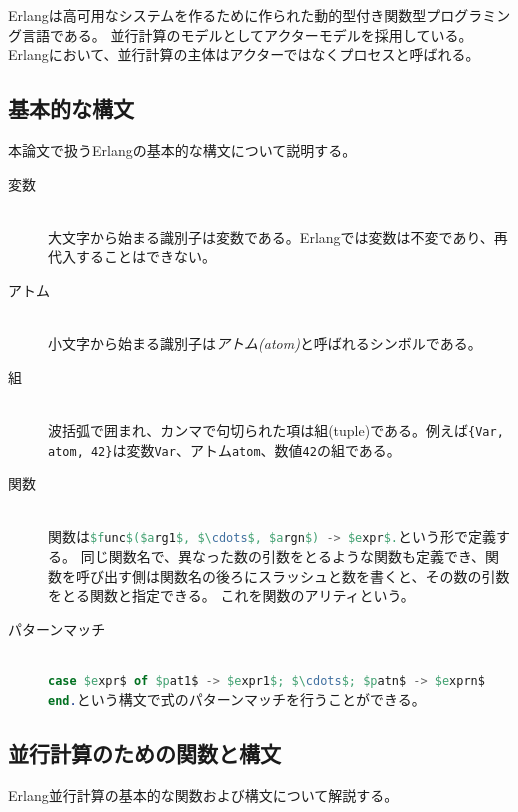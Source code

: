 Erlang\cite{Erlang}は高可用なシステムを作るために作られた動的型付き関数型プログラミング言語である。
並行計算のモデルとしてアクターモデルを採用している。
Erlangにおいて、並行計算の主体はアクターではなくプロセスと呼ばれる。

\subsection{基本的な構文}

本論文で扱うErlangの基本的な構文について説明する。

\begin{description}
\item[変数]\mbox{}\\
  大文字から始まる識別子は変数である。Erlangでは変数は不変であり、再代入することはできない。
\item[アトム]\mbox{}\\
  小文字から始まる識別子は\emph{アトム(atom)}と呼ばれるシンボルである。
\item[組]\mbox{}\\
  波括弧で囲まれ、カンマで句切られた項は組(tuple)である。例えば\lstinline|{Var, atom, 42}|は変数\lstinline{Var}、アトム\lstinline{atom}、数値\lstinline{42}の組である。
\item[関数]\mbox{}\\
  関数は\lstinline[language=Erlang]{$func$($arg1$, $\cdots$, $argn$) -> $expr$.}という形で定義する。
  同じ関数名で、異なった数の引数をとるような関数も定義でき、関数を呼び出す側は関数名の後ろにスラッシュと数を書くと、その数の引数をとる関数と指定できる。
  これを関数のアリティという。
\item[パターンマッチ]\mbox{}\\
  \lstinline[language=Erlang]{case $expr$ of $pat1$ -> $expr1$; $\cdots$; $patn$ -> $exprn$ end.}という構文で式のパターンマッチを行うことができる。
\end{description}

\subsection{並行計算のための関数と構文}

Erlang並行計算の基本的な関数および構文について解説する。

